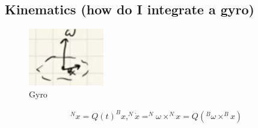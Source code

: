 \subsection{Kinematics (how do I integrate a gyro)}

\begin{figure}
    \centering
    \includegraphics[width=0.2\linewidth]{L11_Images/F2.PNG}
    \caption{Gyro}
    \label{fig:l11f2}
\end{figure}

\begin{align}
    ^N x = Q(t) ^B x, ^N \dot x = ^N \omega \times ^N x = Q(^B \omega \times ^B x)
\end{align}
